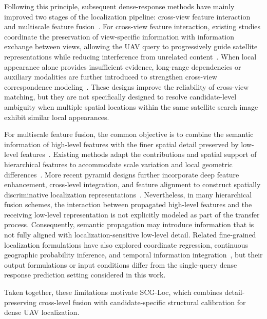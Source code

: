 \documentclass[runningheads]{llncs}
\begin{document}
Following this principle, subsequent dense-response methods have mainly improved two stages of the localization pipeline: cross-view feature interaction and multiscale feature fusion~\cite{chen2024osfpi,kisieliute2026murde,fan2024sspt}. For cross-view feature interaction, existing studies coordinate the preservation of view-specific information with information exchange between views, allowing the UAV query to progressively guide satellite representations while reducing interference from unrelated content~\cite{chen2024osfpi,fan2024sspt}. When local appearance alone provides insufficient evidence, long-range dependencies or auxiliary modalities are further introduced to strengthen cross-view correspondence modeling~\cite{tian2025cmin,xu2026mmglt}. These designs improve the reliability of cross-view matching, but they are not specifically designed to resolve candidate-level ambiguity when multiple spatial locations within the same satellite search image exhibit similar local appearances.

For multiscale feature fusion, the common objective is to combine the semantic information of high-level features with the finer spatial detail preserved by low-level features~\cite{lin2017fpn}. Existing methods adapt the contributions and spatial support of hierarchical features to accommodate scale variation and local geometric differences~\cite{wang2023wamf,he2024dcd,chen2025obtpn,ngo2025amcf}. More recent pyramid designs further incorporate deep feature enhancement, cross-level integration, and feature alignment to construct spatially discriminative localization representations~\cite{ju2025vrpt,kisieliute2026murde}. Nevertheless, in many hierarchical fusion schemes, the interaction between propagated high-level features and the receiving low-level representation is not explicitly modeled as part of the transfer process. Consequently, semantic propagation may introduce information that is not fully aligned with localization-sensitive low-level detail. Related fine-grained localization formulations have also explored coordinate regression, continuous geographic probability inference, and temporal information integration~\cite{deng2026ngc,sun2026cfire,kang2026pfirnet,mo2026star}, but their output formulations or input conditions differ from the single-query dense response prediction setting considered in this work.

Taken together, these limitations motivate SCG-Loc, which combines detail-preserving cross-level fusion with candidate-specific structural calibration for dense UAV localization.
\end{document}

